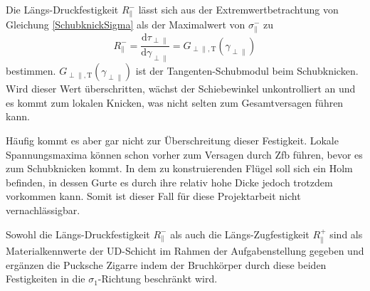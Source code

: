 Die Längs-Druckfestigkeit $R_\parallel^-$ lässt sich aus der Extremwertbetrachtung von Gleichung \ref{SchubknickSigma} als der Maximalwert von $\sigma_{\parallel}^-$ zu
\begin{equation}
	R_\parallel^- = \frac{\mathrm{d}\tau_{\perp\parallel}}{\mathrm{d}\gamma_{\perp\parallel}} = G_{\perp\parallel,\mathrm{T}}(\gamma_{\perp\parallel})
\end{equation}
bestimmen. $G_{\perp\parallel,\mathrm{T}}(\gamma_{\perp\parallel})$ ist der Tangenten-Schubmodul beim Schubknicken. Wird dieser Wert überschritten, wächst der Schiebewinkel unkontrolliert an und es kommt zum lokalen Knicken, was nicht selten zum Gesamtversagen führen kann.

Häufig kommt es aber gar nicht zur Überschreitung dieser Festigkeit. Lokale Spannungsmaxima können schon vorher zum Versagen durch Zfb führen, bevor es zum Schubknicken kommt. In dem zu konstruierenden Flügel soll sich ein Holm befinden, in dessen Gurte es durch ihre relativ hohe Dicke jedoch trotzdem vorkommen kann. Somit ist dieser Fall für diese Projektarbeit nicht vernachlässigbar.

Sowohl die Längs-Druckfestigkeit $R_\parallel^-$ als auch die Längs-Zugfestigkeit $R_\parallel^+$ sind als Materialkennwerte der UD-Schicht im Rahmen der Aufgabenstellung gegeben und ergänzen die Pucksche Zigarre indem der Bruchkörper durch diese beiden Festigkeiten in die $\sigma_1$-Richtung beschränkt wird.
